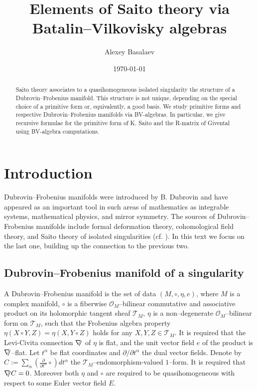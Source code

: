 \documentclass[12pt,a4paper]{amsart}
\def\O{{\mathcal O}}
\def\T{{\mathcal T}}
\newcommand{\p}{{\partial}}
\newcommand{\<}{\left<}
\renewcommand{\>}{\right>}
\def\ns{{\nabla}\hspace{-1.2mm}{\text{\footnotesize{\bf /}}}}
\numberwithin{equation}{section}
\begin{document}
\title{Elements of Saito theory via Batalin--Vilkovisky algebras}

\author{Alexey Basalaev}
\address{A. Basalaev:
\newline
Faculty of Mathematics, HSE University, Usacheva str., 6, 119048 Moscow, Russian Federation
}

\date{\today}

 \begin{abstract}
    Saito theory associates to a quasihomogeneous isolated singularity the structure of a Dubrovin--Frobenius manifold. This structure is not unique, depending on the special choice of a primitive form or, equivalently, a good basis.
    We study primitive forms and respective Dubrovin--Frobenius manifolds via BV-algebras. In particular, we give recursive formulae for the primitive form of K. Saito and the R-matrix of Givental using BV-algebra computations.
 \end{abstract}
 \maketitle


\section{Introduction}

Dubrovin--Frobenius manifolds were introduced by B. Dubrovin and have appeared as an important tool in such areas of mathematics as integrable systems, mathematical physics, and mirror symmetry. The sources of Dubrovin--Frobenius manifolds include formal deformation theory, cohomological field theory, and Saito theory of isolated singularities (cf. \cite{M}). In this text we focus on the last one, building up the connection to the previous two.

\subsection{Dubrovin--Frobenius manifold of a singularity}
A Dubrovin--Frobenius manifold is the set of data $(M,\circ,\eta,e)$, where $M$ is a complex manifold, $\circ$ is a fiberwise $\O_M$--bilinear commutative and associative product on its holomorphic tangent sheaf $\T_M$, $\eta$ is a non--degenerate $\O_M$--bilinear form on $\T_M$, such that the Frobenius algebra property $\eta(X \circ Y, Z) = \eta(X,Y\circ Z)$ holds for any $X,Y,Z \in \T_M$. It is required that the Levi-Civita connection $\ns$ of $\eta$ is flat, and the unit vector field $e$ of the product is $\ns$--flat. Let $t^\alpha$ be flat coordinates and $\p / \p t^\alpha$ the dual vector fields. Denote by $C := \sum_\alpha \left( \frac{\p}{\p t^\alpha} \circ \right) dt^\alpha$ the $\T_M$--endomorphism-valued $1$--form. It is required that $\ns C = 0$. Moreover both $\eta$ and $\circ$ are required to be quasihomogeneous with respect to some Euler vector field $E$.
\end{document}
